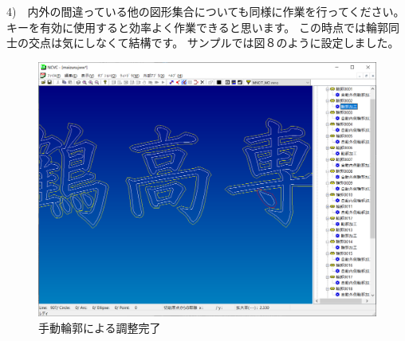 4)　内外の間違っている他の図形集合についても同様に作業を行ってください。
キーを有効に使用すると効率よく作業できると思います。
この時点では輪郭同士の交点は気にしなくて結構です。
サンプルでは図８のように設定しました。

\begin{figure}[H]
\centering
\includegraphics[scale=0.55]{No3/fig/inout4.png}
\caption{手動輪郭による調整完了}
\label{fig:inout4.png}
\end{figure}
